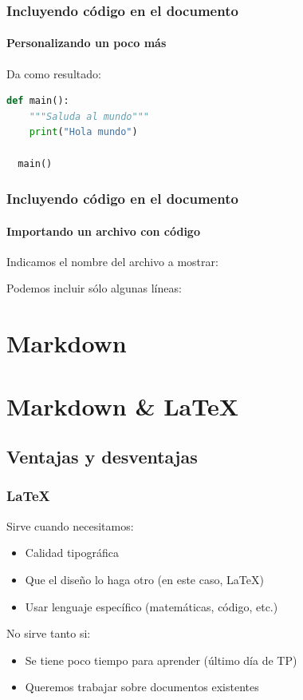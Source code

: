 \documentclass[svgnames]{beamer}
\begin{document}
\begin{frame}[fragile]
  \frametitle{Incluyendo código en el documento}
  \framesubtitle{Personalizando un poco más}
  

  \vfill

  Da como resultado:
  \begin{lstlisting}[language=python]
  def main():
    """Saluda al mundo"""
    print("Hola mundo")
  
  main()
  \end{lstlisting}
\end{frame}

\begin{frame}[fragile]
  \frametitle{Incluyendo código en el documento}
  \framesubtitle{Importando un archivo con código}
  Indicamos el nombre del archivo a mostrar:
  \pause

  \vfill

  Podemos incluir sólo algunas líneas:
  

\end{frame}

\section{Markdown}

\section{Markdown \& \LaTeX}
\subsection{Ventajas y desventajas}
\begin{frame}
  \frametitle{\LaTeX}
  Sirve cuando necesitamos:
  \begin{itemize}
    \item Calidad tipográfica
    \item Que el diseño lo haga otro (en este caso, \LaTeX)
    \item Usar lenguaje específico (matemáticas, código, etc.)
  \end{itemize}\pause
  No sirve tanto si:
  \begin{itemize}
    \item Se tiene poco tiempo para aprender (último día de TP)
    \item Queremos trabajar sobre documentos existentes
  \end{itemize}
\end{frame}
\end{document}
